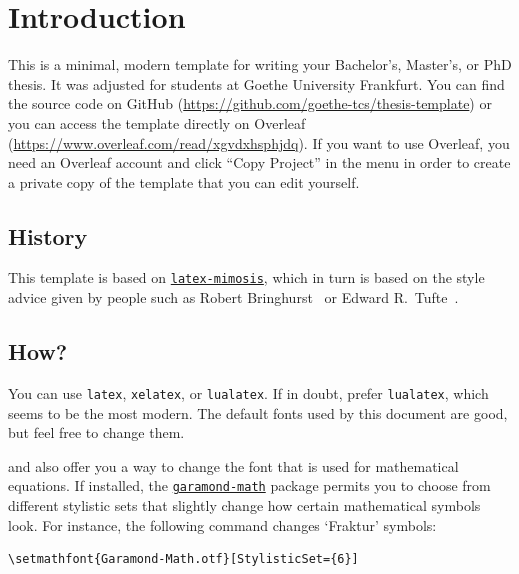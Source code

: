 \chapter{Introduction}

This is a minimal, modern template for writing your Bachelor's, Master's, or PhD thesis.
It was adjusted for students at Goethe University Frankfurt.
You can find the source code on GitHub (\url{https://github.com/goethe-tcs/thesis-template}) or you can access the template directly on Overleaf (\url{https://www.overleaf.com/read/xgvdxhsphjdq}). If you want to use Overleaf, you need an Overleaf account and click \enquote{Copy Project} in the menu in order to create a private copy of the template that you can edit yourself.

\section{History}

This template is based on \href{https://github.com/Pseudomanifold/latex-mimosis}{\texttt{latex-mimosis}}, which in turn is based on the style advice given by people such as Robert
Bringhurst~\cite{Bringhurst12} or Edward R.\
Tufte~\cite{Tufte90,Tufte01}.

\section{How?}

You can use \texttt{latex}, \texttt{xelatex}, or \texttt{lualatex}. If in doubt, prefer \texttt{lualatex}, which seems to be the most modern.
The default fonts used by this document are good, but feel free to change them.

\XeLaTeX and \LuaLaTeX also offer you a way to change the font that is
used for mathematical equations. If installed, the
\href{https://ctan.org/pkg/garamond-math}{\texttt{garamond-math}}
package permits you to choose from different stylistic sets that
slightly change how certain mathematical symbols look. For instance, the
following command changes `Fraktur' symbols:
%
\begin{verbatim}
\setmathfont{Garamond-Math.otf}[StylisticSet={6}]
\end{verbatim}

